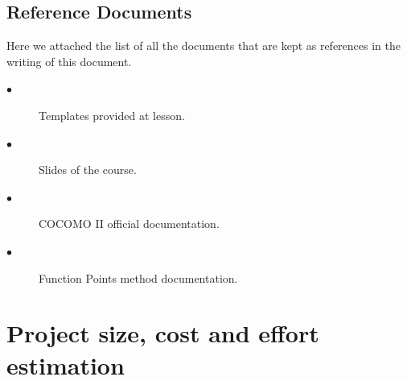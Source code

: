 \documentclass[a4paper,10pt]{article}
\begin{document}
\subsection{Reference Documents}
Here we attached the list of all the documents that are kept as references in the writing of this document.
\begin{description}
    \item[$\bullet$] Templates provided at lesson.
    \item[$\bullet$] Slides of the course.
    \item[$\bullet$] COCOMO II official documentation.
    \item[$\bullet$] Function Points method documentation.
  \end{description}
 \newpage
 
\section{Project size, cost and effort estimation}
\end{document}
